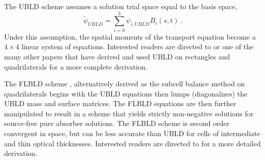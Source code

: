 \documentclass{mc2015}
\newcommand{\benum}{\begin{equation}} 			%
\newcommand{\eenum}{\end{equation}}
\newcommand{\beanum}{\begin{eqnarray}}  %
\newcommand{\eeanum}{\end{eqnarray}}
\newcommand{\eqts}[1]{Eqs. (\ref{#1})}  %
\newcommand{\B}[1]{\ensuremath{{B_{#1} }}}
\newcommand{\p}{\ensuremath{ \partial}}
\newcommand{\abs}[1]{\ensuremath{\left\lvert #1 \right\rvert}}
\newcommand{\omg}{\ensuremath{\vec{\Omega}}}
\newcommand{\pec}{\, ,}
\newcommand{\pep}{\, .}
\begin{document}

The UBLD scheme assumes a solution trial space equal to the basis space,
\benum
\widetilde{\psi}_{UBLD} = \sum_{i=0}^3{\psi_{i,UBLD} \B{i}(s,t)  } \pep
\eenum
Under this assumption, the spatial moments of the transport equation become a $4\times 4$ linear system of equations.  
Interested readers are directed to \cite{adams_dfem} or one of the many other papers that have derived and used UBLD on rectangles and quadrilaterals for a more complete derivation.

The FLBLD scheme \cite{flbld,adams_dfem}, alternatively derived as the subcell balance method on quadrilaterals \cite{adams_scb} begins with the UBLD equations then lumps (diagonalizes) the UBLD mass and surface matrices.  The FLBLD equations are then further manipulated to result in a scheme that yields strictly non-negative solutions for source-free pure absorber solutions.  The FLBLD scheme is second order convergent in space, but can be less accurate than UBLD for cells of intermediate and thin optical thicknesses.  Interested readers are directed to \cite{flbld,adams_dfem,adams_scb} for a more detailed derivation.
\end{document}
